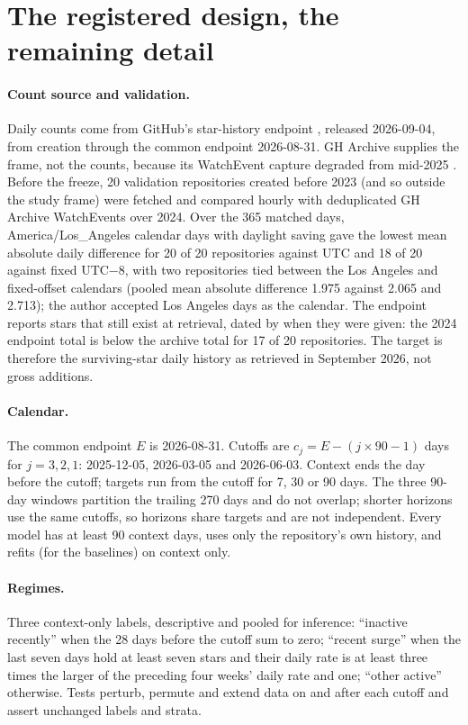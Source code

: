 \section{The registered design, the remaining detail}
\label{app:design}

\paragraph{Count source and validation.} Daily counts come from GitHub's star-history endpoint
\citep{github-star-history-2026, github-api-star-history}, released 2026-09-04, from creation through the
common endpoint 2026-08-31. GH Archive supplies the frame, not the counts, because its WatchEvent capture
degraded from mid-2025 \citep{gharchive-issue-320}. Before the freeze, 20 validation repositories created
before 2023 (and so outside the study frame) were fetched and compared hourly with deduplicated GH Archive
WatchEvents over 2024. Over the 365 matched days, America/Los\_Angeles calendar days with daylight saving gave
the lowest mean absolute daily difference for 20 of 20 repositories against UTC and 18 of 20 against fixed
UTC$-$8, with two repositories tied between the Los Angeles and fixed-offset calendars (pooled mean absolute
difference 1.975 against 2.065 and 2.713); the author accepted Los Angeles days as the calendar. The endpoint
reports stars that still exist at retrieval, dated by when they were given: the 2024 endpoint total is below
the archive total for 17 of 20 repositories. The target is therefore the surviving-star daily history as
retrieved in September 2026, not gross additions.

\paragraph{Calendar.} The common endpoint $E$ is 2026-08-31. Cutoffs are $c_j = E - (j \times 90 - 1)$
days for $j = 3, 2, 1$: 2025-12-05, 2026-03-05 and 2026-06-03. Context ends the day before the cutoff;
targets run from the cutoff for 7, 30 or 90 days. The three 90-day windows partition the trailing 270 days
and do not overlap; shorter horizons use the same cutoffs, so horizons share targets and are not independent.
Every model has at least 90 context days, uses only the repository's own history, and refits (for the
baselines) on context only.

\paragraph{Regimes.} Three context-only labels, descriptive and pooled for inference: ``inactive recently''
when the 28 days before the cutoff sum to zero; ``recent surge'' when the last seven days hold at least seven
stars and their daily rate is at least three times the larger of the preceding four weeks' daily rate and one;
``other active'' otherwise. Tests perturb, permute and extend data on and after each cutoff and assert
unchanged labels and strata.


